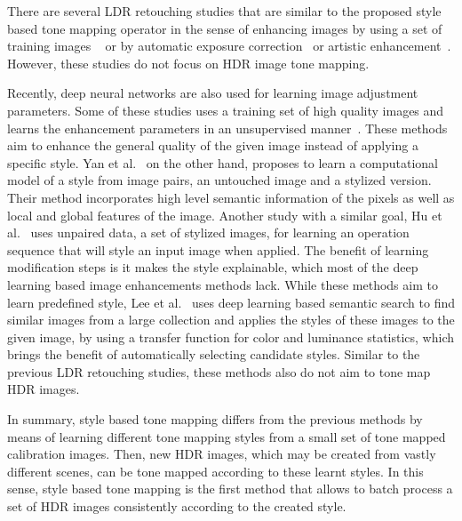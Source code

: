 There are several LDR retouching studies that are similar to the proposed style based tone mapping operator in the sense of enhancing images by using a set of training images ~\cite{kang2010personalization, bychkovsky2011learning} or by automatic exposure correction~\cite{yuan2012automatic} or artistic enhancement~\cite{son2014art}. However, these studies do not focus on HDR image tone mapping.


Recently, deep neural networks are also used for learning image adjustment parameters. Some of these studies uses a training set of high quality images and learns the enhancement parameters in an unsupervised manner~\cite{park2018distort, chen2018deep,ignatov2018wespe}. These methods aim to enhance the general quality of the given image instead of applying a specific style. Yan et al.~\cite{yan2016automatic} on the other hand, proposes to learn a computational model of a style from image pairs, an untouched image and a stylized version. Their method incorporates high level semantic information of the pixels as well as local and global features of the image. Another study with a similar goal, Hu et al.~\cite{hu2018exposure} uses unpaired data, a set of stylized images, for learning an operation sequence that will style an input image when applied. The benefit of learning modification steps is it makes the style explainable, which most of the deep learning based image enhancements methods lack. While these methods aim to learn predefined style, Lee et al.~\cite{lee2016automatic} uses deep learning based semantic search to find similar images from a large collection and applies the styles of these images to the given image, by using a transfer function for color and luminance statistics, which brings the benefit of automatically selecting candidate styles. Similar to the previous LDR retouching studies, these methods also do not aim to tone map HDR images.

In summary, style based tone mapping differs from the previous methods by means of learning different tone mapping styles from a small set of tone mapped calibration images. Then, new HDR images, which may be created from vastly different scenes, can be tone mapped according to these learnt styles. In this sense, style based tone mapping is the first method that allows to batch process a set of HDR images consistently according to the created style.


